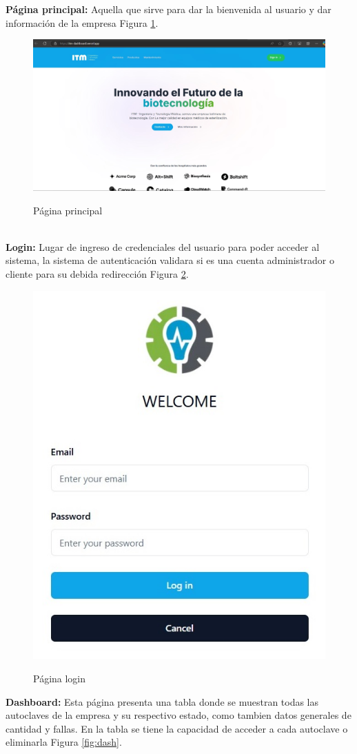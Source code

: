 \textbf{Página principal:} Aquella que sirve para dar la bienvenida al usuario y dar información de la empresa Figura \ref{fig:prin}.
\begin{figure}[!htb]
    \centering
    \caption{Página principal} %
    {\includegraphics[width=0.8\columnwidth]{Figuras/7.jpg}}\\
    \label{fig:prin}
\end{figure}\\
\textbf{Login:} Lugar de ingreso de credenciales del usuario para poder acceder al sistema, la sistema de autenticación validara si es una cuenta administrador o cliente para su debida redirección Figura \ref{fig:log}.
\begin{figure}[!htb]
    \centering
    \caption{Página login} %
    {\includegraphics[width=0.5\columnwidth]{Figuras/4.jpg}}\\
    \label{fig:log}
\end{figure}
\newpage
\textbf{Dashboard:} Esta página presenta una tabla donde se muestran todas las autoclaves de la empresa y su respectivo estado, como tambien datos generales de cantidad y fallas. En la tabla se tiene la capacidad de acceder a cada autoclave o eliminarla Figura \ref{fig:dash}.
